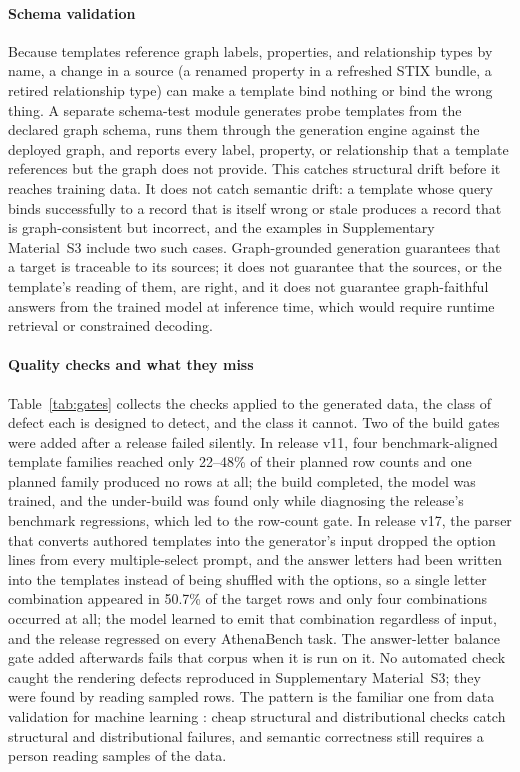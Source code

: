 \documentclass[a4paper,fleqn]{cas-dc}
\begin{document}
\paragraph{Schema validation}
Because templates reference graph labels, properties, and relationship types by name, a change in a source (a renamed property in a refreshed STIX bundle, a retired relationship type) can make a template bind nothing or bind the wrong thing. A separate schema-test module generates probe templates from the declared graph schema, runs them through the generation engine against the deployed graph, and reports every label, property, or relationship that a template references but the graph does not provide. This catches structural drift before it reaches training data. It does not catch semantic drift: a template whose query binds successfully to a record that is itself wrong or stale produces a record that is graph-consistent but incorrect, and the examples in Supplementary Material~S3 include two such cases. Graph-grounded generation guarantees that a target is traceable to its sources; it does not guarantee that the sources, or the template's reading of them, are right, and it does not guarantee graph-faithful answers from the trained model at inference time, which would require runtime retrieval or constrained decoding.

\paragraph{Quality checks and what they miss}
Table~\ref{tab:gates} collects the checks applied to the generated data, the class of defect each is designed to detect, and the class it cannot. Two of the build gates were added after a release failed silently. In release v11, four benchmark-aligned template families reached only 22--48\% of their planned row counts and one planned family produced no rows at all; the build completed, the model was trained, and the under-build was found only while diagnosing the release's benchmark regressions, which led to the row-count gate. In release v17, the parser that converts authored templates into the generator's input dropped the option lines from every multiple-select prompt, and the answer letters had been written into the templates instead of being shuffled with the options, so a single letter combination appeared in 50.7\% of the target rows and only four combinations occurred at all; the model learned to emit that combination regardless of input, and the release regressed on every AthenaBench task. The answer-letter balance gate added afterwards fails that corpus when it is run on it. No automated check caught the rendering defects reproduced in Supplementary Material~S3; they were found by reading sampled rows. The pattern is the familiar one from data validation for machine learning \citep{breck2019datavalidation}: cheap structural and distributional checks catch structural and distributional failures, and semantic correctness still requires a person reading samples of the data.
\end{document}
